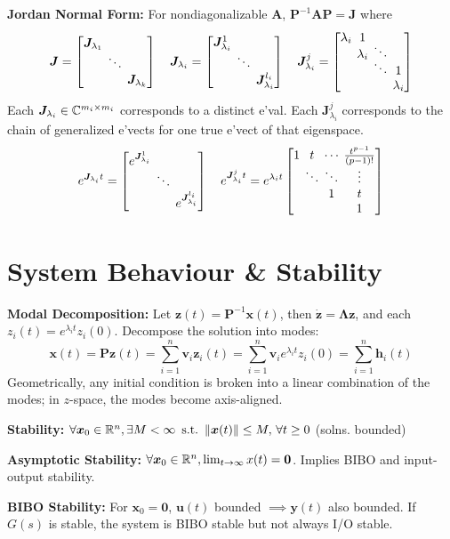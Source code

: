 \documentclass[twocolumn, 8pt]{extarticle}
\newcommand{\newvdots}{\vphantom{\int\limits^x}\smash[t]{\vdots}}
\newcommand{\newddots}{\vphantom{\int\limits^x}\smash[t]{\ddots}}
\begin{document}
\textbf{Jordan Normal Form:} For nondiagonalizable \(\bm A\), \(\bm P^{-1}\bm A\bm P = \bm J\) where
\[\setlength{\arraycolsep}{2pt}
\bm J = \diagthree{\bm J_{\lambda _1}}{\newddots}{\bm J_{\lambda _k}} \quad
\bm J_{\lambda _i} = \diagthree{\bm J_{\lambda _i}^1}{\newddots}{\bm J_{\lambda _i}^{l_i}} \quad
\bm J_{\lambda _i}^j = \begin{bmatrix}\lambda _i & 1 & & \\[-1ex] & \lambda _i & \newddots & \\[-1ex] & & \newddots & 1 \\ & & & \lambda _i \end{bmatrix}\]
Each \(\bm J_{\lambda _i} \in \mathbb{C}^{m_i \times m_i}\) corresponds to a distinct e'val. Each \(\bm J_{\lambda _i}^j\)
corresponds to the chain of generalized e'vects for one true e'vect of that eigenspace.
\[\setlength{\arraycolsep}{2pt}
e^{\bm J_{\lambda _i}t} = \diagthree{e^{\bm J_{\lambda _i}^1}}{\newddots}{e^{\bm J_{\lambda _i}^{l_i}}} \quad
e^{\bm J_{\lambda _i}^jt} = e^{\lambda _it}\begin{bmatrix}1 & t & \cdots & \frac{t^{p - 1}}{(p - 1)!} \\ & \newddots & \newddots & \newvdots \\ & & 1 & t \\ & & & 1 \end{bmatrix}\]

\section{System Behaviour \& Stability}

\textbf{Modal Decomposition:} Let \(\bm z(t) = \bm P^{-1}\bm x(t)\), then \(\dot{\bm z} = \bm\Lambda\bm z\), and each
\(z_i(t) = e^{\lambda _it}z_i(0)\). Decompose the solution into modes:
\[\bm x(t) = \bm P\bm z(t) = \sum _{i = 1}^n \bm v_i\bm z_i(t) = \sum _{i = 1}^n \bm v_ie^{\lambda _it}z_i(0) = \sum _{i = 1}^n \bm h_i(t)\]
Geometrically, any initial condition is broken into a linear combination of the modes; in \(z\)-space, the modes become
axis-aligned.

\textbf{Stability:} \(\forall \bm x_0 \in \mathbb{R}^n, \exists M < \infty \enspace\mathrm{s.t.}\enspace \lVert\bm x(t)\rVert \leq M,\,\forall t \geq 0\)
(solns. bounded)

\textbf{Asymptotic Stability:} \(\forall \bm x_0 \in \mathbb{R}^n, \lim _{t \to \infty} x(t) = \bm 0\).
Implies BIBO and input-output stability.

\textbf{BIBO Stability:} For \(\bm x_0 = \bm 0\), \(\bm u(t)\) bounded \(\implies \bm y(t)\) also bounded.
If \(G(s)\) is stable, the system is BIBO stable but not always I/O stable.
\end{document}
